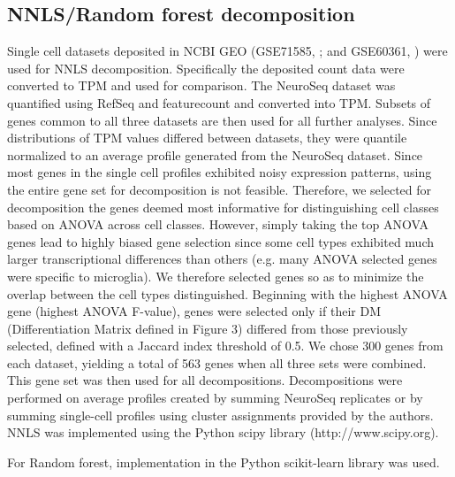 \subsection{NNLS/Random forest decomposition}
Single cell datasets deposited in NCBI GEO (GSE71585, \cite{Tasic_2016}; and GSE60361, \cite{Zeisel_2015}) were used for NNLS decomposition. Specifically the deposited count data were converted to TPM and used for comparison. The NeuroSeq dataset was quantified using RefSeq and featurecount \citep{Liao_2013} and converted into TPM. Subsets of genes common to all three datasets are then used for all further analyses. Since distributions of TPM values  differed between datasets, they were quantile normalized to an average profile generated from the NeuroSeq dataset. Since most genes in the single cell profiles exhibited noisy expression patterns, using the entire gene set for decomposition is not feasible. Therefore, we selected for decomposition the genes deemed most informative for distinguishing cell classes based on ANOVA across cell classes. However, simply taking the top ANOVA genes lead to highly biased gene selection since some cell types exhibited much larger transcriptional differences than others (e.g. many ANOVA selected genes were specific to microglia). We therefore selected genes so as to minimize the overlap between the cell types distinguished. Beginning with the highest ANOVA gene (highest ANOVA F-value), genes were selected only if their DM (Differentiation Matrix defined in Figure 3) differed from those previously selected, defined with a Jaccard index threshold  of 0.5. We chose 300 genes from each dataset, yielding a total of 563 genes when all three sets were combined. This gene set was then used for all decompositions. Decompositions were performed on average profiles created by summing NeuroSeq replicates or by summing single-cell profiles using cluster assignments provided by the authors. NNLS was implemented using the Python scipy library (http://www.scipy.org). 

For Random forest, implementation in the Python scikit-learn library \citep{scikit-learn} was used. 

